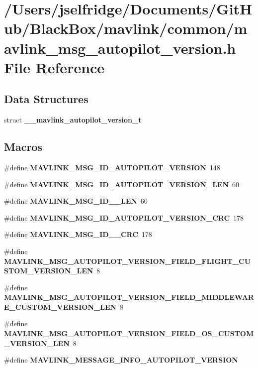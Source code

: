\section{/\+Users/jselfridge/\+Documents/\+Git\+Hub/\+Black\+Box/mavlink/common/mavlink\+\_\+msg\+\_\+autopilot\+\_\+version.h File Reference}
\label{mavlink__msg__autopilot__version_8h}
\subsection*{Data Structures}
\begin{DoxyCompactItemize}
\item 
struct \textbf{ \+\_\+\+\_\+mavlink\+\_\+autopilot\+\_\+version\+\_\+t}
\end{DoxyCompactItemize}
\subsection*{Macros}
\begin{DoxyCompactItemize}
\item 
\#define \textbf{ M\+A\+V\+L\+I\+N\+K\+\_\+\+M\+S\+G\+\_\+\+I\+D\+\_\+\+A\+U\+T\+O\+P\+I\+L\+O\+T\+\_\+\+V\+E\+R\+S\+I\+ON}~148
\item 
\#define \textbf{ M\+A\+V\+L\+I\+N\+K\+\_\+\+M\+S\+G\+\_\+\+I\+D\+\_\+\+A\+U\+T\+O\+P\+I\+L\+O\+T\+\_\+\+V\+E\+R\+S\+I\+O\+N\+\_\+\+L\+EN}~60
\item 
\#define \textbf{ M\+A\+V\+L\+I\+N\+K\+\_\+\+M\+S\+G\+\_\+\+I\+D\+\_\+\_\+\+L\+EN}~60
\item 
\#define \textbf{ M\+A\+V\+L\+I\+N\+K\+\_\+\+M\+S\+G\+\_\+\+I\+D\+\_\+\+A\+U\+T\+O\+P\+I\+L\+O\+T\+\_\+\+V\+E\+R\+S\+I\+O\+N\+\_\+\+C\+RC}~178
\item 
\#define \textbf{ M\+A\+V\+L\+I\+N\+K\+\_\+\+M\+S\+G\+\_\+\+I\+D\+\_\+\_\+\+C\+RC}~178
\item 
\#define \textbf{ M\+A\+V\+L\+I\+N\+K\+\_\+\+M\+S\+G\+\_\+\+A\+U\+T\+O\+P\+I\+L\+O\+T\+\_\+\+V\+E\+R\+S\+I\+O\+N\+\_\+\+F\+I\+E\+L\+D\+\_\+\+F\+L\+I\+G\+H\+T\+\_\+\+C\+U\+S\+T\+O\+M\+\_\+\+V\+E\+R\+S\+I\+O\+N\+\_\+\+L\+EN}~8
\item 
\#define \textbf{ M\+A\+V\+L\+I\+N\+K\+\_\+\+M\+S\+G\+\_\+\+A\+U\+T\+O\+P\+I\+L\+O\+T\+\_\+\+V\+E\+R\+S\+I\+O\+N\+\_\+\+F\+I\+E\+L\+D\+\_\+\+M\+I\+D\+D\+L\+E\+W\+A\+R\+E\+\_\+\+C\+U\+S\+T\+O\+M\+\_\+\+V\+E\+R\+S\+I\+O\+N\+\_\+\+L\+EN}~8
\item 
\#define \textbf{ M\+A\+V\+L\+I\+N\+K\+\_\+\+M\+S\+G\+\_\+\+A\+U\+T\+O\+P\+I\+L\+O\+T\+\_\+\+V\+E\+R\+S\+I\+O\+N\+\_\+\+F\+I\+E\+L\+D\+\_\+\+O\+S\+\_\+\+C\+U\+S\+T\+O\+M\+\_\+\+V\+E\+R\+S\+I\+O\+N\+\_\+\+L\+EN}~8
\item 
\#define \textbf{ M\+A\+V\+L\+I\+N\+K\+\_\+\+M\+E\+S\+S\+A\+G\+E\+\_\+\+I\+N\+F\+O\+\_\+\+A\+U\+T\+O\+P\+I\+L\+O\+T\+\_\+\+V\+E\+R\+S\+I\+ON}
\end{DoxyCompactItemize}
